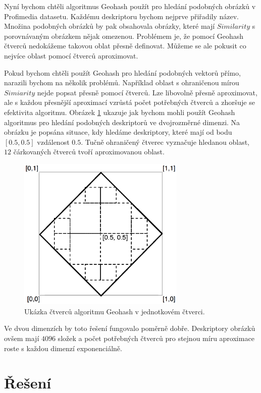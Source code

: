Nyní bychom chtěli algoritmus Geohash použít pro hledání podobných obrázků v Profimedia datasetu. Každému deskriptoru bychom nejprve přiřadily název. Množina podobných obrázků by pak obsahovala obrázky, které mají $Similarity$ s porovnávaným obrázkem nějak omezenou. Problémem je, že pomocí Geohash čtverců nedokážeme takovou oblat přesně definovat. Můžeme se ale pokusit co nejvíce oblast pomocí čtverců aproximovat. 

Pokud bychom chtěli použít Geohash pro hledání podobných vektorů přímo, narazili bychom na několik problémů. Například oblast s ohraničenou mírou $Simiarity$ nejde popsat přesně pomocí čtverců. Lze libovolně přesně aproximovat, ale s každou přesnější aproximací vzrůstá počet potřebných čtverců a zhoršuje se efektivita algoritmu. Obrázek \ref{fig:geohash_use} ukazuje jak bychom mohli použít Geohash algoritmus pro hledání podobných deskriptorů ve dvojrozměrné dimenzi. Na obrázku je popsána situace, kdy hledáme deskriptory, které mají od bodu $[0.5, 0.5]$ vzdálenost $0.5$. Tučně ohraničený čtverec vyznačuje hledanou oblast, $12$ čárkovaných čtverců tvoří aproximovanou oblast.

\begin{figure}[h]
  \centering
  \includegraphics[width=80mm]{geohash_use.eps}
  \caption{Ukázka čtverců algoritmu Geohash v jednotkovém čtverci.}
  \label{fig:geohash_use}
\end{figure}

Ve dvou dimenzích by toto řešení fungovalo poměrně dobře. Deskriptory obrázků ovšem mají $4096$ složek a počet potřebných čtverců pro stejnou míru aproximace roste s každou dimenzí exponenciálně.

\section{Řešení}









